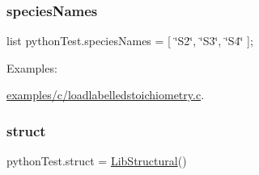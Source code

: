 \subsubsection{\texorpdfstring{species\+Names}{speciesNames}}
{\footnotesize\ttfamily list python\+Test.\+species\+Names = \mbox{[} \char`\"{}S2\char`\"{}, \char`\"{}S3\char`\"{}, \char`\"{}S4\char`\"{} \mbox{]};}

\begin{Desc}
\item[Examples\+: ]\par
\hyperlink{examples_2c_2loadlabelledstoichiometry_8c-example}{examples/c/loadlabelledstoichiometry.\+c}.\end{Desc}
\mbox{\label{namespacepython_test_ac673393a25db52d0a3bdc27bbbd13135}} 
\subsubsection{\texorpdfstring{struct}{struct}}
{\footnotesize\ttfamily python\+Test.\+struct = \hyperlink{classstructural_1_1_lib_structural}{Lib\+Structural}()}

